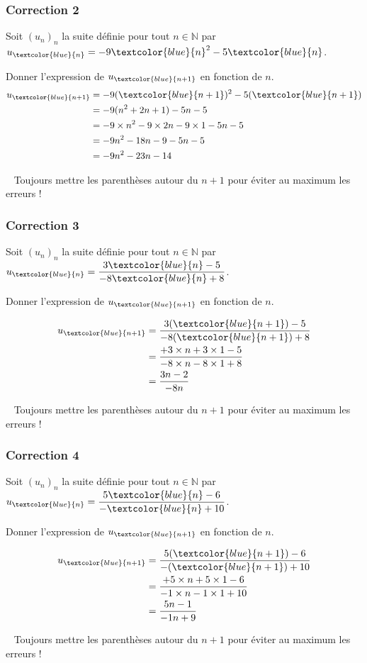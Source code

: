 \documentclass[15pt, mathserif]{beamer}
\newcommand{\N}{\mathbb{N}}			%
\begin{document}
\begin{frame}
\vspace{-10mm}
	\frametitle{Correction 2}
Soit $(u_n)_n$ la suite définie pour tout $n \in \N$ par $u_{\textcolor{blue}{n}}=-9\textcolor{blue}{n}^2-5\textcolor{blue}{n}$. 
 
 Donner l'expression de $u_{\textcolor{blue}{n+1}}$ en fonction de $n$. \begin{align*} u_{\textcolor{blue}{n+1}}&=-9(\textcolor{blue}{n+1})^2-5(\textcolor{blue}{n+1})\\ &=-9(n^2+2n+1)-5n-5\\ &=-9\times n^2-9 \times 2n-9\times 1-5n-5\\ &=-9n^2-18n-9-5n-5\\ &=-9n^2-23n-14\end{align*} 
 
 \bcattention ~ Toujours mettre les parenthèses autour du $n+1$ pour éviter au maximum les erreurs !\end{frame}


\begin{frame}
\vspace{-10mm}
	\frametitle{Correction 3}
\vspace*{1cm} 
 Soit $(u_n)_n$ la suite définie pour tout $n \in \N$ par $u_{\textcolor{blue}{n}}=\dfrac{3\textcolor{blue}{n}-5}{-8\textcolor{blue}{n}+8}$. 
 
 Donner l'expression de $u_{\textcolor{blue}{n+1}}$ en fonction de $n$. 
 
 \begin{align*} 
 u_{\textcolor{blue}{n+1}} 
 &= \dfrac{3(\textcolor{blue}{n+1})-5}{-8(\textcolor{blue}{n+1})+8}\\ 
  &= \dfrac{+3\times n+3\times 1-5}{-8\times n-8\times 1 +8}\\ 
 &= \dfrac{3n-2}{-8n} 
 \end{align*} 
 
 \bcattention ~ Toujours mettre les parenthèses autour du $n+1$ pour éviter au maximum les erreurs ! 
\end{frame}


\begin{frame}
\vspace{-10mm}
	\frametitle{Correction 4}
\vspace*{1cm} 
 Soit $(u_n)_n$ la suite définie pour tout $n \in \N$ par $u_{\textcolor{blue}{n}}=\dfrac{5\textcolor{blue}{n}-6}{-\textcolor{blue}{n}+10}$. 
 
 Donner l'expression de $u_{\textcolor{blue}{n+1}}$ en fonction de $n$. 
 
 \begin{align*} 
 u_{\textcolor{blue}{n+1}} 
 &= \dfrac{5(\textcolor{blue}{n+1})-6}{-(\textcolor{blue}{n+1})+10}\\ 
  &= \dfrac{+5\times n+5\times 1-6}{-1\times n-1\times 1 +10}\\ 
 &= \dfrac{5n-1}{-1n+9} 
 \end{align*} 
 
 \bcattention ~ Toujours mettre les parenthèses autour du $n+1$ pour éviter au maximum les erreurs ! 
\end{frame}
\end{document}
